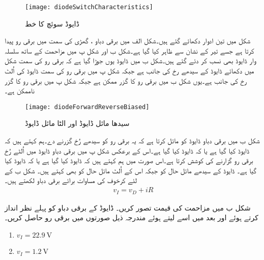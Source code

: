 \begin{figure}
\centering
\texttt{[image: diodeSwitchCharacteristics]}
\caption{ڈایوڈ سوئچ کا خط}
\label{شکل_ڈایوڈ_سوئچ_کا_خط}
\end{figure}
	شکل   میں تین ادوار دکھائے گئے ہیں۔شکل  الف میں برقی دباو ، گھڑی کی سمت میں برقی رو  پیدا کرتا ہے جسے تیر کے نشان سے ظاہر کیا گیا ہے۔شکل  ب اور شکل  پ میں مزاحمت کے ساتھ سلسلہ وار ڈایوڈ   بھی نسب کر دئے گئے ہیں۔شکل  ب میں ڈایوڈ   یوں جوڑا گیا ہے کہ برقی رو  کی سمت شکل   میں دکھائے ڈایوڈ کے سیدھے رخ کی جانب ہے جبکہ شکل  پ میں برقی رو کی سمت ڈایوڈ کی اُلٹ رخ کی جانب ہے۔یوں شکل  ب میں برقی رو  کا گزر ممکن ہے جبکہ شکل  پ میں برقی رو  کا گزر ناممکن ہے۔
\begin{figure}
\centering
\texttt{[image: diodeForwardReverseBiased]}
\caption{سیدھا مائل ڈایوڈ اور الٹا مائل ڈایوڈ}
\label{شکل_ڈایوڈ_سیدھا_مائل_الٹا_مائل}
\end{figure}
شکل  ب میں برقی دباو  ڈایوڈ   کو مائل کرتا ہے کہ یہ برقی رو کو سیدھے رُخ گزرنے دے۔ہم کہتے ہیں کہ ڈایوڈ     کیا گیا ہے یا کہ ڈایوڈ    کیا گیا ہے۔اس کے برعکس شکل  پ میں برقی دباو  ڈایوڈ   میں اُلٹے رُخ برقی رو گزارنے کی کوشش کرتا ہے۔اس صورت میں ہم کہتے ہیں کہ ڈایوڈ     کیا گیا ہے یا کہ ڈایوڈ    کیا گیا ہے۔ ڈایوڈ کے سیدھے مائل حال کو  جبکہ اس کے اُلٹ مائل حال کو  بھی کہتے ہیں۔ 
	شکل  ب کے لئے کرخوف  کی مساوات برائے برقی دباو لکھتے ہیں۔
\begin{align} \label{مساوات_ڈایوڈ_سیدھا_مائل_مثال_الف}
v_I=v_D+i R
\end{align}


شکل  ب میں مزاحمت کی قیمت  تصور کریں۔ ڈایوڈ کے برقی دباو  کو پہلے نظر انداز کرتے ہوئے اور بعد میں اسے  لیتے ہوئے مندرجہ ذیل صورتوں میں برقی رو حاصل کریں۔
\begin{enumerate}
\item
$v_I=\SI{22.9}{\volt}$
\item
$v_I=\SI{1.2}{\volt}$
\end{enumerate}

